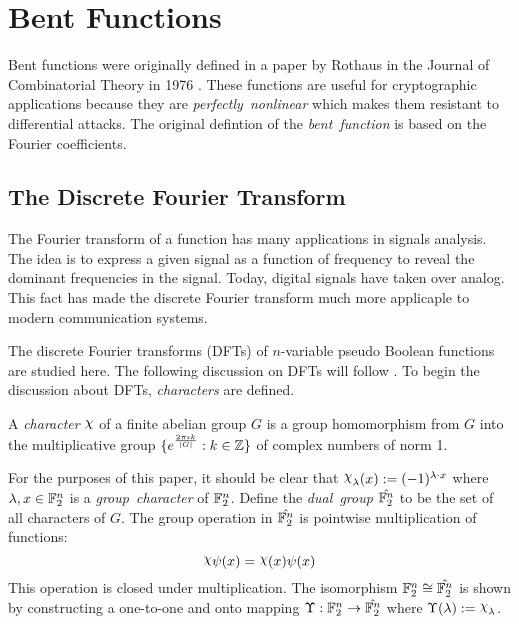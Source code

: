 \section{Bent Functions}
\par Bent functions were originally defined in a paper by Rothaus in the
Journal of Combinatorial Theory in 1976 \cite{art:r76}. These functions are
useful for cryptographic applications because they are {\em perfectly\ 
nonlinear} which makes them resistant to differential
attacks. The original defintion of the {\em bent\ function} is based on the
Fourier coefficients.

\subsection{The Discrete Fourier Transform}
\par The Fourier transform of a function has many applications in signals
analysis. The idea is to express a given signal as a function of frequency
to reveal the dominant frequencies in the signal. Today, digital signals
have taken over analog. This fact has made the discrete Fourier transform
much more applicaple to modern communication systems.

\par The discrete Fourier transforms (DFTs) of $n$-variable pseudo Boolean
functions are studied here. The following discussion on DFTs will follow
\cite{bk:t99}. To begin the discussion about DFTs, {\em characters} are
defined.

\begin{definition}\cite{bk:t99}
  A {\em character} $\Chi$ of a finite abelian group $G$ is a group
  homomorphism from $G$ into the multiplicative group
  $\{e^{\frac{2\pi\imath k}{\lvert G \rvert}}:k\in\mathbb{Z}\}$ of complex numbers
  of norm 1.
\end{definition}

For the purposes of this paper, it should be clear that
$\Chi_\lambda(x):=(-1)^{\lambda\cdot x}$ where $\lambda,x\in\mathbb{F}_2^n$ is a
{\em group\ character} of $\mathbb{F}_2^n$. Define the {\em dual\ group}
$\hat{\mathbb{F}_2^n}$ to be the set of all characters of $G$. The group operation
in $\hat{\mathbb{F}_2^n}$ is pointwise multiplication of functions:
\[
\Chi\psi(x)=\Chi(x)\psi(x)
\]
This operation is closed under multiplication. The isomorphism
$\mathbb{F}_2^n\cong\hat{\mathbb{F}_2^n}$ is shown by constructing a one-to-one and onto
mapping $\Upsilon:\mathbb{F}_2^n\rightarrow\hat{\mathbb{F}_2^n}$ where
$\Upsilon(\lambda):=\Chi_\lambda$.


